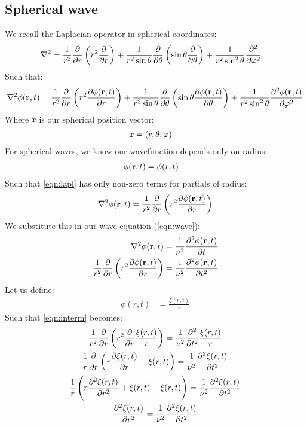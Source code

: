 \subsection{Spherical wave}

We recall the Laplacian operator in spherical coordinates:
\begin{align}
    \nabla^2 &= \frac{1}{r^2}\frac{\partial }{\partial r}\left(r^2\frac{\partial }{\partial r}\right)+\frac{1}{r^2\sin\theta}\frac{\partial }{\partial \theta}\left(\sin\theta\frac{\partial }{\partial \theta}\right)+\frac{1}{r^2\sin^2\theta}\frac{\partial ^2}{\partial \varphi^2}
\end{align}
Such that:
\begin{align}
    \label{eqn:lapl}
    \nabla^2 \phi(\vb{r},t) = \frac{1}{r^2}\frac{\partial }{\partial r}\left(r^2\frac{\partial \phi(\vb{r},t)}{\partial r}\right)+\frac{1}{r^2\sin\theta}\frac{\partial }{\partial \theta}\left(\sin\theta\frac{\partial \phi(\vb{r},t)}{\partial \theta}\right)+\frac{1}{r^2\sin^2\theta}\frac{\partial ^2\phi(\vb{r},t)}{\partial \varphi^2}
\end{align}
Where $\vb{r}$ is our spherical position vector:
\begin{align*}
    \vb{r} &= (r,\theta,\varphi)
\end{align*}
For spherical waves, we know our wavefunction depends only on radius:
\begin{align*}
    \phi(\vb{r},t) &= \phi(r,t)
\end{align*}
Such that \ref{eqn:lapl} has only non-zero terms for partials of radius:
\begin{align}
    \nabla^2 \phi(\vb{r},t) = \frac{1}{r^2}\frac{\partial }{\partial r}\left(r^2\frac{\partial \phi(\vb{r},t)}{\partial r}\right)
\end{align}
We substitute this in our wave equation (\ref{eqn:wave}):
\begin{align}
    \label{eqn:interm}
    \nabla^2 \phi(\vb{r},t) &= \frac{1}{\nu^2}\frac{\partial ^2 \phi(\vb{r},t)}{\partial t}\\
    \frac{1}{r^2}\frac{\partial }{\partial r}\left(r^2\frac{\partial \phi(\vb{r},t)}{\partial r}\right) &= \frac{1}{\nu^2}\frac{\partial ^2 \phi(\vb{r},t)}{\partial t^2}
\end{align}
Let us define:
\begin{align*}
    \phi(r,t) &= \frac{\xi(r,t)}{r}
\end{align*}
Such that \ref{eqn:interm} becomes:
\begin{gather*}
    \frac{1}{r^2}\frac{\partial }{\partial r}\left(r^2\frac{\partial }{\partial r}\frac{\xi(r,t)}{r}\right) = \frac{1}{\nu^2}\frac{\partial ^2 }{\partial t^2}\frac{\xi(r,t)}{r}\\
    \frac{1}{r}\frac{\partial }{\partial r}\left(r\frac{\partial \xi(r,t)}{\partial r}-\xi(r,t)\right) = \frac{1}{\nu^2}\frac{\partial ^2 \xi(r,t)}{\partial t^2}\\
    \frac{1}{r}\left(r\frac{\partial ^2\xi(r,t)}{\partial r^2}+\xi(r,t)-\xi(r,t)\right) = \frac{1}{\nu^2}\frac{\partial ^2 \xi(r,t)}{\partial t^2}\\
    \frac{\partial ^2\xi(r,t)}{\partial r^2}= \frac{1}{\nu^2}\frac{\partial ^2 \xi(r,t)}{\partial t^2}
\end{gather*}
